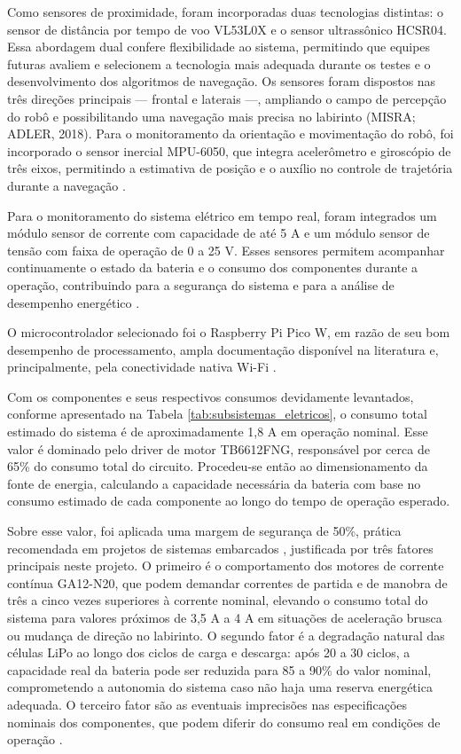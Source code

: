 Como sensores de proximidade, foram incorporadas duas tecnologias distintas: o 
sensor de distância por tempo de voo VL53L0X e o sensor ultrassônico HCSR04. 
Essa abordagem dual confere flexibilidade ao sistema, permitindo que equipes 
futuras avaliem e selecionem a tecnologia mais adequada durante os testes e o 
desenvolvimento dos algoritmos de navegação. Os sensores foram dispostos nas 
três direções principais — frontal e laterais —, ampliando o campo de percepção 
do robô e possibilitando uma navegação mais precisa no labirinto (MISRA; ADLER, 
2018). Para o monitoramento da orientação e movimentação do robô, foi 
incorporado o sensor inercial MPU-6050, que integra acelerômetro e giroscópio de 
três eixos, permitindo a estimativa de posição e o auxílio no controle de trajetória 
durante a navegação \cite{feitosa2025}.

Para o monitoramento do sistema elétrico em tempo real, foram integrados um 
módulo sensor de corrente com capacidade de até 5 A e um módulo sensor de 
tensão com faixa de operação de 0 a 25 V. Esses sensores permitem acompanhar 
continuamente o estado da bateria e o consumo dos componentes durante a 
operação, contribuindo para a segurança do sistema e para a análise de 
desempenho energético \cite{rashid2014}.

O microcontrolador selecionado foi o Raspberry Pi Pico W, em razão de seu bom 
desempenho de processamento, ampla documentação disponível na literatura e, 
principalmente, pela conectividade nativa Wi-Fi \cite{feitosa2025}.

Com os componentes e seus respectivos consumos devidamente levantados, 
conforme apresentado na Tabela \ref{tab:subsistemas_eletricos}, o consumo total estimado do sistema é de 
aproximadamente 1,8 A em operação nominal. Esse valor é dominado pelo driver 
de motor TB6612FNG, responsável por cerca de 65\% do consumo total do circuito. 
Procedeu-se então ao dimensionamento da fonte de energia, calculando a 
capacidade necessária da bateria com base no consumo estimado de cada 
componente ao longo do tempo de operação esperado.

Sobre esse valor, foi aplicada uma margem de segurança de 50\%, prática 
recomendada em projetos de sistemas embarcados \cite{rashid2014}, justificada por 
três fatores principais neste projeto. O primeiro é o comportamento dos motores de 
corrente contínua GA12-N20, que podem demandar correntes de partida e de 
manobra de três a cinco vezes superiores à corrente nominal, elevando o consumo 
total do sistema para valores próximos de 3,5 A a 4 A em situações de aceleração 
brusca ou mudança de direção no labirinto. O segundo fator é a degradação natural 
das células LiPo ao longo dos ciclos de carga e descarga: após 20 a 30 ciclos, a 
capacidade real da bateria pode ser reduzida para 85 a 90\% do valor nominal, 
comprometendo a autonomia do sistema caso não haja uma reserva energética 
adequada. O terceiro fator são as eventuais imprecisões nas especificações 
nominais dos componentes, que podem diferir do consumo real em condições de 
operação \cite{rashid2014}.

